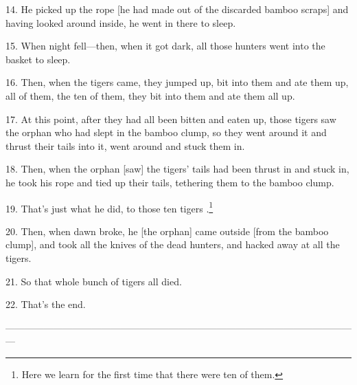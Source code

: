 14. He picked up the rope [he had made out of the discarded bamboo scraps] and
having looked around inside, he went in there to sleep.

15. When night fell---then, when it got dark, all those hunters went into the basket
to sleep.

16. Then, when the tigers came, they jumped up, bit into them and ate them up,
all of them, the ten of them, they bit into them and ate them all up.

17. At this point, after they had all been bitten and eaten up, those tigers saw
the orphan who had slept in the bamboo clump, so they went around it and thrust
their tails into it, went around and stuck them in.

18. Then, when the orphan [saw] the tigers' tails had been thrust in and stuck
in, he took his rope and tied up their tails, tethering them to the bamboo clump.

19. That's just what he did, to those ten tigers .\footnote{Here we learn for the first time that there were ten of them.}

20. Then, when dawn broke, he [the orphan] came outside [from the bamboo clump],
and took all the knives of the dead hunters, and hacked away at all the tigers.

21. So that whole bunch of tigers all died.

22. That's the end.

---------------------------------------------------------------------------------------------------------------

